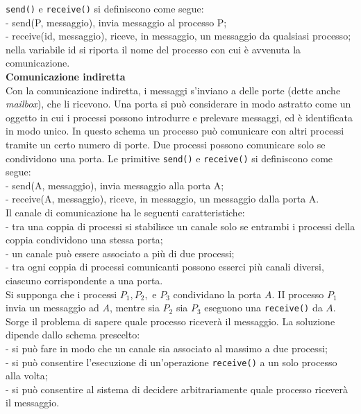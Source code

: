\documentclass[11pt,a4paper]{article}
\begin{document}
\texttt{send()} e \texttt{receive()} si definiscono come segue:\medskip\\
- send(P, messaggio), invia messaggio al processo P;\medskip\\
- receive(id, messaggio), riceve, in messaggio, un messaggio da qualsiasi processo; nella
variabile id si riporta il nome del processo con cui è avvenuta la comunicazione.\medskip\\
%
\textbf{Comunicazione indiretta}\\
Con la comunicazione indiretta, i messaggi s'inviano a delle porte (dette anche \emph{mailbox}), che li ricevono. Una porta si può considerare in modo astratto come un oggetto in cui
i processi possono introdurre e prelevare messaggi, ed è identificata in modo unico.
In questo schema un processo può comunicare con altri processi tramite un certo numero di
porte. Due processi possono comunicare solo se condividono una porta. Le primitive
\texttt{send()} e \texttt{receive()} si definiscono come segue:\medskip\\
- send(A, messaggio), invia messaggio alla porta A;\medskip\\
- receive(A, messaggio), riceve, in messaggio, un messaggio dalla porta A.\medskip\\
Il canale di comunicazione ha le seguenti caratteristiche:\medskip\\
- tra una coppia di processi si stabilisce un canale solo se entrambi i processi della cop­pia condividono una stessa porta;\medskip\\
- un canale può essere associato a più di due processi;\medskip\\
- tra ogni coppia di processi comunicanti possono esserci più canali diversi, ciascuno
corrispondente a una porta.\medskip\\
Si supponga che i processi $P_1, P_2,$ e $P_3$ condividano la porta $A$. II processo $P_1$
invia un messaggio ad $A$, mentre sia $P_2$ sia $P_3$ eseguono una \texttt{receive()} da $A$.\\
Sorge il pro­blema di sapere quale processo riceverà il messaggio. La soluzione dipende dallo schema pre­scelto:\medskip\\
- si può fare in modo che un canale sia associato al massimo a due processi;\medskip\\
- si può consentire l'esecuzione di un'operazione \texttt{receive()} a un solo processo alla volta;\medskip\\
- si può consentire al sistema di decidere arbitrariamente quale processo riceverà il mes­saggio.\medskip\\
\end{document}
